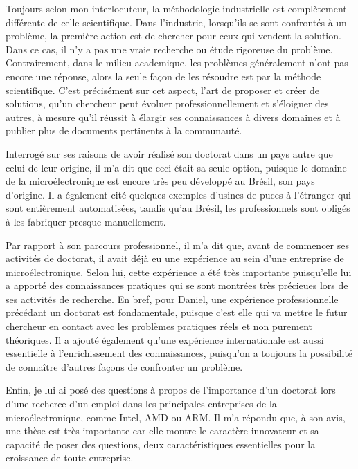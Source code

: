 \documentclass{article}
\begin{document}
Toujours selon mon interlocuteur, la méthodologie industrielle est complètement
différente de celle scientifique. Dans l'industrie, lorsqu'ils se sont
confrontés à un problème, la première action est de chercher pour ceux qui vendent la
solution. Dans ce cas, il n'y a pas une vraie recherche ou étude rigoreuse du
problème. Contrairement, dans le milieu academique, les problèmes généralement
n'ont pas encore une réponse, alors la seule façon de les résoudre est par la 
méthode scientifique. C'est précisément sur cet aspect, l'art de proposer et
créer de solutions, qu'un chercheur peut évoluer professionnellement et
s'éloigner des autres,  à mesure qu'il réussit à élargir ses connaissances
à divers domaines et à publier plus de documents pertinents à la communauté.

\vspace{12pt}

Interrogé sur ses raisons de avoir réalisé son doctorat dans un pays autre que
celui de leur origine, il m'a dit que ceci était sa seule option, puisque le
domaine de la microélectronique est encore très peu développé au Brésil, son
pays d'origine. Il a également cité quelques exemples d'usines de puces à
l'étranger qui sont entièrement automatisées, tandis qu'au Brésil, les
professionnels sont obligés à les fabriquer presque manuellement.

\vspace{12pt}

Par rapport à son parcours professionnel, il m'a dit que, avant de commencer
ses activités de doctorat, il avait déjà eu une expérience au sein d'une
entreprise de microélectronique. Selon lui, cette expérience a été très
importante puisqu'elle lui a apporté des connaissances pratiques qui se sont
montrées très précieues lors de ses activités de recherche. En bref,
pour Daniel, une expérience professionnelle précédant un doctorat est
fondamentale, puisque c'est elle qui va mettre le futur chercheur en contact
avec les problèmes pratiques réels et non purement théoriques. Il a ajouté
également qu'une expérience internationale est aussi essentielle à
l'enrichissement des connaissances, puisqu'on a toujours la possibilité de
connaître d'autres façons de confronter un problème.

\vspace{12pt}

Enfin, je lui ai posé des questions à propos de l'importance d'un doctorat
lors d'une recherce d'un emploi dans les principales entreprises de la
microélectronique, comme Intel, AMD ou ARM. Il m'a répondu que, à
son avis, une thèse est très importante car elle montre le caractère innovateur
et sa capacité de poser des questions, deux caractéristiques essentielles pour
la croissance de toute entreprise.
\end{document}
